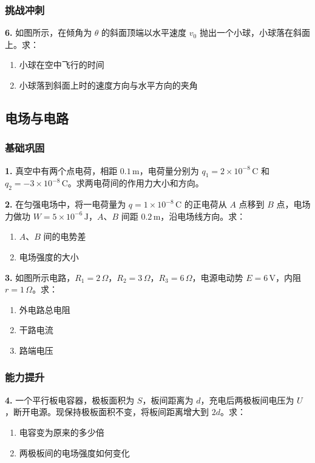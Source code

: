 \subsubsection{挑战冲刺}

\textbf{6.} 如图所示，在倾角为 $\theta$ 的斜面顶端以水平速度 $v_0$ 抛出一个小球，小球落在斜面上。求：
\begin{enumerate}
  \item 小球在空中飞行的时间
  \item 小球落到斜面上时的速度方向与水平方向的夹角
\end{enumerate}

\subsection{电场与电路}

\subsubsection{基础巩固}

\textbf{1.} 真空中有两个点电荷，相距 $0.1\,\text{m}$，电荷量分别为 $q_1 = 2\times10^{-8}\,\text{C}$ 和 $q_2 = -3\times10^{-8}\,\text{C}$。求两电荷间的作用力大小和方向。

\textbf{2.} 在匀强电场中，将一电荷量为 $q = 1\times10^{-8}\,\text{C}$ 的正电荷从 $A$ 点移到 $B$ 点，电场力做功 $W = 5\times10^{-6}\,\text{J}$，$A$、$B$ 间距 $0.2\,\text{m}$，沿电场线方向。求：
\begin{enumerate}
  \item $A$、$B$ 间的电势差
  \item 电场强度的大小
\end{enumerate}

\textbf{3.} 如图所示电路，$R_1 = 2\,\Omega$，$R_2 = 3\,\Omega$，$R_3 = 6\,\Omega$，电源电动势 $E = 6\,\text{V}$，内阻 $r = 1\,\Omega$。求：
\begin{enumerate}
  \item 外电路总电阻
  \item 干路电流
  \item 路端电压
\end{enumerate}

\subsubsection{能力提升}

\textbf{4.} 一个平行板电容器，极板面积为 $S$，板间距离为 $d$，充电后两极板间电压为 $U$，断开电源。现保持极板面积不变，将板间距离增大到 $2d$。求：
\begin{enumerate}
  \item 电容变为原来的多少倍
  \item 两极板间的电场强度如何变化
\end{enumerate}

